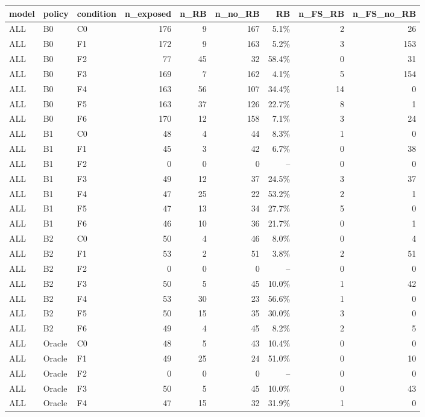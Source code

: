 \begin{tabular}{lllrrrrrr}
\toprule
model & policy & condition & n\_exposed & n\_RB & n\_no\_RB & RB & n\_FS\_RB & n\_FS\_no\_RB \\
\midrule
ALL & B0 & C0 & 176 & 9 & 167 & 5.1\% & 2 & 26 \\
ALL & B0 & F1 & 172 & 9 & 163 & 5.2\% & 3 & 153 \\
ALL & B0 & F2 & 77 & 45 & 32 & 58.4\% & 0 & 31 \\
ALL & B0 & F3 & 169 & 7 & 162 & 4.1\% & 5 & 154 \\
ALL & B0 & F4 & 163 & 56 & 107 & 34.4\% & 14 & 0 \\
ALL & B0 & F5 & 163 & 37 & 126 & 22.7\% & 8 & 1 \\
ALL & B0 & F6 & 170 & 12 & 158 & 7.1\% & 3 & 24 \\
ALL & B1 & C0 & 48 & 4 & 44 & 8.3\% & 1 & 0 \\
ALL & B1 & F1 & 45 & 3 & 42 & 6.7\% & 0 & 38 \\
ALL & B1 & F2 & 0 & 0 & 0 & -- & 0 & 0 \\
ALL & B1 & F3 & 49 & 12 & 37 & 24.5\% & 3 & 37 \\
ALL & B1 & F4 & 47 & 25 & 22 & 53.2\% & 2 & 1 \\
ALL & B1 & F5 & 47 & 13 & 34 & 27.7\% & 5 & 0 \\
ALL & B1 & F6 & 46 & 10 & 36 & 21.7\% & 0 & 1 \\
ALL & B2 & C0 & 50 & 4 & 46 & 8.0\% & 0 & 4 \\
ALL & B2 & F1 & 53 & 2 & 51 & 3.8\% & 2 & 51 \\
ALL & B2 & F2 & 0 & 0 & 0 & -- & 0 & 0 \\
ALL & B2 & F3 & 50 & 5 & 45 & 10.0\% & 1 & 42 \\
ALL & B2 & F4 & 53 & 30 & 23 & 56.6\% & 1 & 0 \\
ALL & B2 & F5 & 50 & 15 & 35 & 30.0\% & 3 & 0 \\
ALL & B2 & F6 & 49 & 4 & 45 & 8.2\% & 2 & 5 \\
ALL & Oracle & C0 & 48 & 5 & 43 & 10.4\% & 0 & 0 \\
ALL & Oracle & F1 & 49 & 25 & 24 & 51.0\% & 0 & 10 \\
ALL & Oracle & F2 & 0 & 0 & 0 & -- & 0 & 0 \\
ALL & Oracle & F3 & 50 & 5 & 45 & 10.0\% & 0 & 43 \\
ALL & Oracle & F4 & 47 & 15 & 32 & 31.9\% & 1 & 0 \\

\end{tabular}
